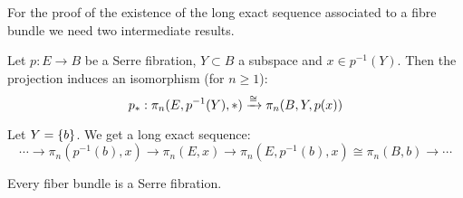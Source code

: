 For the proof of the existence of the long exact sequence associated to a fibre bundle we need two intermediate results.

\begin{proposition**}
Let $p:E\to B$ be a Serre fibration, $Y\subset B$ a subspace and $x\in p^{-1}(Y)$. Then the projection induces an isomorphism (for $n\geq 1$):
\[p_*:\pi_n(E,p^{-1}(Y),*)\xrightarrow{\cong}\pi_n(B,Y,p(x))\]
\end{proposition**}

\begin{corollary**}
Let $Y=\{b\}$. We get a long exact sequence:
\[\cdots\to\pi_n(p^{-1}(b),x)\to\pi_n(E,x)\to\pi_n(E,p^{-1}(b),x)\cong\pi_n(B,b)\to\cdots\]
\end{corollary**}

\begin{theorem**}
Every fiber bundle is a Serre fibration.
\end{theorem**}
